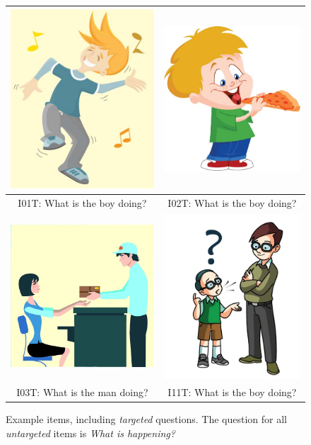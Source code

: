 \documentclass[12pt,notitlepage]{article}
\begin{document}
\begin{figure}[h]
\begin{center}
\begin{tabular}{|c|c|}
\hline
\includegraphics[width=0.35\columnwidth,trim=0 0 0 -3]{../figures/I01.jpg} & \includegraphics[width=0.35\columnwidth,trim=0 0 0 -3]{../figures/I02.jpg}\\
\hline
I01T: What is the boy doing? & I02T: What is the boy doing? \\
\hline
\hline
\includegraphics[width=0.35\columnwidth,trim=0 0 0 -3]{../figures/I03.jpg} & \includegraphics[width=0.35\columnwidth,trim=0 0 0 -3]{../figures/I11.jpg}\\
\hline
I03T: What is the man doing? & I11T: What is the boy doing? \\
\hline
\end{tabular}
\end{center}
\caption{Example items, including \textit{targeted} questions. The question for all \textit{untargeted} items is \textit{What is happening?}}
\label{fig:appendix1}
\end{figure}

\clearpage 



\end{document}
